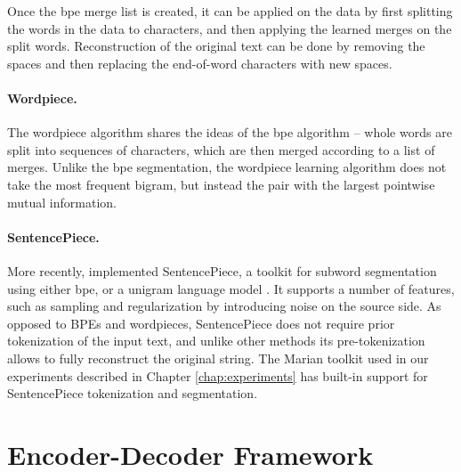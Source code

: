 Once the \ac{bpe} merge list is created, it can be applied on the data by first
splitting the words in the data to characters, and then applying the learned
merges on the split words. Reconstruction of the original text can be done by
removing the spaces and then replacing the end-of-word characters with new
spaces.

\paragraph{Wordpiece.} The wordpiece algorithm
\citep{schuster-nakajima-2012-japanese,wu2016google} shares the ideas of the
\ac{bpe} algorithm -- whole words are split into sequences of characters, which
are then merged according to a list of merges. Unlike the \ac{bpe}
segmentation, the wordpiece learning algorithm does not take the most frequent
bigram, but instead the pair with the largest pointwise mutual
information.

\paragraph{SentencePiece.} More recently,
\citet{kudo-richardson-2018-sentencepiece} implemented SentencePiece, a toolkit
for subword segmentation using either \ac{bpe}, or a unigram language model
\citep{kudo-2018-subword}. It supports a number of features, such as sampling
and regularization by introducing noise on the source side. As opposed to BPEs
and wordpieces, SentencePiece does not require prior tokenization of the input
text, and unlike other methods its pre-tokenization allows to fully reconstruct
the original string. The Marian toolkit
\citep{junczys-dowmunt-etal-2018-marian} used in our experiments described in
Chapter \ref{chap:experiments} has built-in support for SentencePiece
tokenization and segmentation.


\section{Encoder-Decoder Framework}
\label{sec:encdec}

